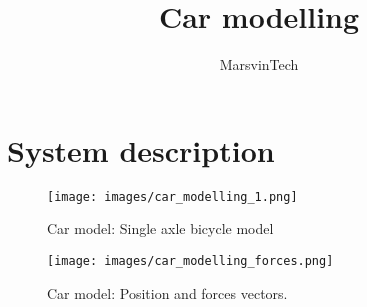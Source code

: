 \documentclass[12pt]{article}
\title{Car modelling}
\author{MarsvinTech}
\begin{document}
\maketitle

\section{System description}
\begin{figure}[H]
    \centering
    \texttt{[image: images/car\_modelling\_1.png]}
    \caption{Car model: Single axle bicycle model}
    \label{car_system}
\end{figure}

\begin{figure}[H]
    \centering
    \texttt{[image: images/car\_modelling\_forces.png]}
    \caption{Car model: Position and forces vectors.}
    \label{car_system_forces}
\end{figure}
\end{document}
